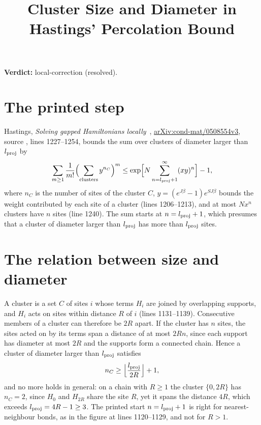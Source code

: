 \documentclass{article}
\title{Cluster Size and Diameter in Hastings' Percolation Bound}
\author{}
\date{}
\providecommand{\gapnote}[2]{\par\noindent\textbf{Verdict:} #1 (#2).\par}
\begin{document}
\maketitle
\gapnote{local-correction}{resolved}

\section{The printed step}
Hastings, \emph{Solving gapped Hamiltonians locally}~\cite{Hastings2006Solving},
\href{https://arxiv.org/abs/cond-mat/0508554v3}{arXiv:cond-mat/0508554v3},
source , lines 1227--1254, bounds the sum over clusters of
diameter larger than $l_{\rm proj}$ by
\begin{align}
 \sum_{m\ge1}\frac1{m!}\Bigl(\sum_{\rm clusters}y^{n_C}\Bigr)^m
 \le\exp\Bigl[N\sum_{n=l_{\rm proj}+1}^{\infty}(xy)^n\Bigr]-1,
 \label{eq:hastings05_percolation_printed}
\end{align}
where $n_C$ is the number of sites of the cluster $C$,
$y=(e^{J\beta}-1)e^{SJ\beta}$ bounds the weight contributed by each site of a
cluster (lines 1206--1213), and at most $Nx^n$ clusters have $n$ sites
(line 1240). The sum starts at $n=l_{\rm proj}+1$,
which presumes that a cluster of diameter larger than $l_{\rm proj}$ has more
than $l_{\rm proj}$ sites.

\section{The relation between size and diameter}
A cluster is a set $C$ of sites $i$ whose terms $H_i$ are joined by
overlapping supports, and $H_i$ acts on sites within distance $R$ of $i$
(lines 1131--1139). Consecutive members of a cluster can therefore be $2R$
apart. If the cluster has $n$ sites, the sites acted on by its terms span a
distance of at most $2Rn$, since each support has diameter at most $2R$ and
the supports form a connected chain. Hence a cluster of diameter larger than
$l_{\rm proj}$ satisfies
\begin{align}
 n_C\ge\Bigl\lfloor\frac{l_{\rm proj}}{2R}\Bigr\rfloor+1,
 \label{eq:hastings05_percolation_size}
\end{align}
and no more holds in general: on a chain with $R\ge1$ the cluster $\{0,2R\}$
has $n_C=2$, since $H_0$ and $H_{2R}$ share the site $R$, yet it spans the
distance $4R$, which exceeds $l_{\rm proj}=4R-1\ge3$. The printed start
$n=l_{\rm proj}+1$ is right for nearest-neighbour bonds, as in the figure at
lines 1120--1129, and not for $R>1$.
\end{document}
